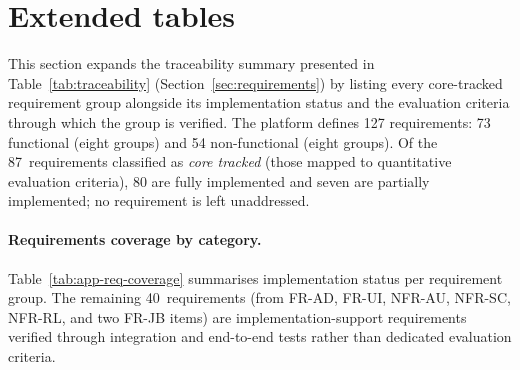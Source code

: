 \documentclass[a4paper]{sapthesis}
\begin{document}
\section{Extended tables}
\label{app:extended-tables}

This section expands the traceability summary presented in
Table~\ref{tab:traceability} (Section~\ref{sec:requirements}) by
listing every core-tracked requirement group alongside its
implementation status and the evaluation criteria through which the
group is verified.  The platform defines 127 requirements: 73
functional (eight groups) and 54 non-functional (eight groups).  Of the
87~requirements classified as \emph{core tracked} (those mapped to
quantitative evaluation criteria), 80 are fully implemented and seven
are partially implemented; no requirement is left unaddressed.

\paragraph{Requirements coverage by category.}
Table~\ref{tab:app-req-coverage} summarises implementation status per
requirement group.  The remaining 40~requirements (from FR-AD, FR-UI,
NFR-AU, NFR-SC, NFR-RL, and two FR-JB items) are
implementation-support requirements verified through integration and
end-to-end tests rather than dedicated evaluation criteria.
\end{document}
